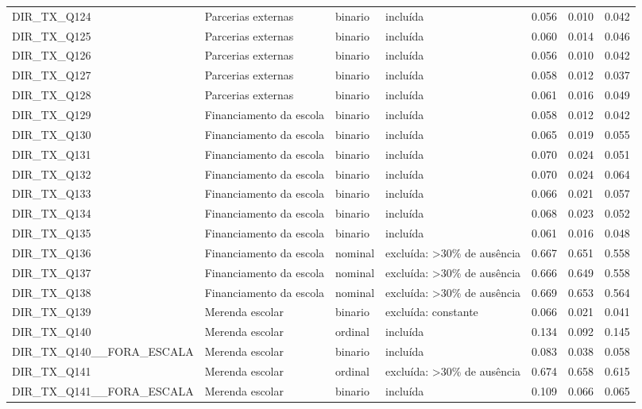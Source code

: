 \begin{tabular}{llllrrr}
DIR\_TX\_Q124 & Parcerias externas & binario & incluída & 0.056 & 0.010 & 0.042 \\
DIR\_TX\_Q125 & Parcerias externas & binario & incluída & 0.060 & 0.014 & 0.046 \\
DIR\_TX\_Q126 & Parcerias externas & binario & incluída & 0.056 & 0.010 & 0.042 \\
DIR\_TX\_Q127 & Parcerias externas & binario & incluída & 0.058 & 0.012 & 0.037 \\
DIR\_TX\_Q128 & Parcerias externas & binario & incluída & 0.061 & 0.016 & 0.049 \\
DIR\_TX\_Q129 & Financiamento da escola & binario & incluída & 0.058 & 0.012 & 0.042 \\
DIR\_TX\_Q130 & Financiamento da escola & binario & incluída & 0.065 & 0.019 & 0.055 \\
DIR\_TX\_Q131 & Financiamento da escola & binario & incluída & 0.070 & 0.024 & 0.051 \\
DIR\_TX\_Q132 & Financiamento da escola & binario & incluída & 0.070 & 0.024 & 0.064 \\
DIR\_TX\_Q133 & Financiamento da escola & binario & incluída & 0.066 & 0.021 & 0.057 \\
DIR\_TX\_Q134 & Financiamento da escola & binario & incluída & 0.068 & 0.023 & 0.052 \\
DIR\_TX\_Q135 & Financiamento da escola & binario & incluída & 0.061 & 0.016 & 0.048 \\
DIR\_TX\_Q136 & Financiamento da escola & nominal & excluída: >30\% de ausência & 0.667 & 0.651 & 0.558 \\
DIR\_TX\_Q137 & Financiamento da escola & nominal & excluída: >30\% de ausência & 0.666 & 0.649 & 0.558 \\
DIR\_TX\_Q138 & Financiamento da escola & nominal & excluída: >30\% de ausência & 0.669 & 0.653 & 0.564 \\
DIR\_TX\_Q139 & Merenda escolar & binario & excluída: constante & 0.066 & 0.021 & 0.041 \\
DIR\_TX\_Q140 & Merenda escolar & ordinal & incluída & 0.134 & 0.092 & 0.145 \\
DIR\_TX\_Q140\_\_FORA\_ESCALA & Merenda escolar & binario & incluída & 0.083 & 0.038 & 0.058 \\
DIR\_TX\_Q141 & Merenda escolar & ordinal & excluída: >30\% de ausência & 0.674 & 0.658 & 0.615 \\
DIR\_TX\_Q141\_\_FORA\_ESCALA & Merenda escolar & binario & incluída & 0.109 & 0.066 & 0.065 \\

\end{tabular}
